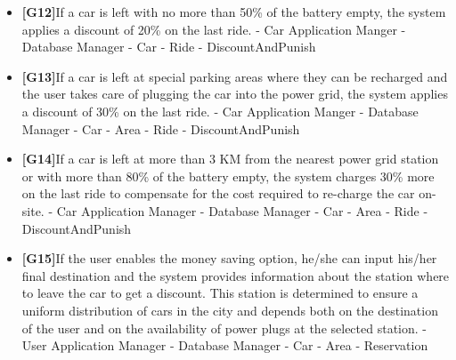 \documentclass{article}
\begin{document}
\begin{itemize}
		\item\textbf{[G12]}If a car is left with no more than 50\% of the battery empty, the system applies a discount of 20\% on the last ride.
		\newline - Car Application Manger 
		\newline - Database Manager 
		\newline - Car
		\newline - Ride
		\newline - DiscountAndPunish
		
		\item\textbf{[G13]}If a car is left at special parking areas where they can be recharged and the user takes care of plugging the car into the power grid, the system applies a discount of 30\% on the last ride.
		\newline - Car Application Manger 
		\newline - Database Manager 
		\newline - Car
		\newline - Area
		\newline - Ride
		\newline - DiscountAndPunish
		
		\item\textbf{[G14]}If a car is left at more than 3 KM from the nearest power grid station or with more than 80\% of the battery empty, the system charges 30\% more on the last ride to compensate for the cost required to re-charge the car on-site.
		\newline - Car Application Manager
		\newline - Database Manager
		\newline - Car 
		\newline - Area
		\newline - Ride
		\newline - DiscountAndPunish
		
		\item\textbf{[G15]}If the user enables the money saving option, he/she can input his/her final destination and the system provides information about the station where to leave the car to get a discount. This station is determined to ensure a uniform distribution of cars in the city and depends both on the destination of the user and on the availability of power plugs at the selected station.
		\newline - User Application Manager
		\newline - Database Manager
		\newline - Car
		\newline - Area
		\newline - Reservation
		
		
		
	\end{itemize}
\end{document}
